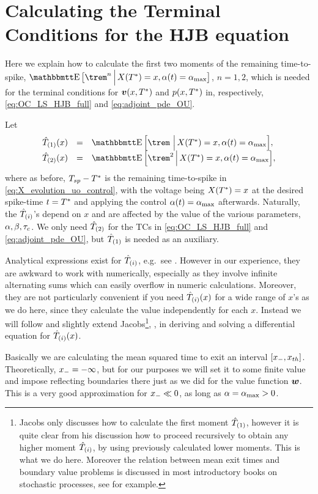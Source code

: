\section{Calculating the Terminal Conditions for the HJB equation}
\label{sec:valuefun_TCs}
Here we explain how to calculate the first two moments of the remaining
time-to-spike, $\Exp \big[\trem^n \,\Big|\, X(\T) = x, \a(t) = \amax
\big]$, $n=1,2$, which is needed for the terminal conditions for ${ \boldsymbol{v} }(x,{ T^* })$
and $p(x,{ T^* })$ in, respectively, \cref{eq:OC_LS_HJB_full} and
\cref{eq:adjoint_pde_OU}.

Let
\begin{equation}
\begin{array}{lcl}
\Tone(x) &=& \Exp \Big[\trem \,\,\Big|\, X(\T) = x, \a(t) = \amax
\Big],
\\
\Ttwo(x) &=&
\Exp \Big[\trem^2 \,\Big|\, X(\T) = x, \a(t) = \amax \Big],
\end{array}
\end{equation}
where as before, $T_{sp}-{ T^* }$ is the remaining time-to-spike in
\cref{eq:X_evolution_uo_control}, with the voltage being $X({ T^* }) = x$ at the desired
spike-time $t={ T^* }$ and applying the control $\alpha(t) = { \alpha_{\textrm{max}} }$ afterwards.
Naturally, the ${ \hat{T}_{(i)} }$'s depend on $x$ and are affected by the value of the
various parameters, $\alpha,\beta,\tau_c$. We only  need ${ \hat{T}_{(2)} }$ for the TCs in
\cref{eq:OC_LS_HJB_full} and \cref{eq:adjoint_pde_OU}, but ${ \hat{T}_{(1)} }$ is needed as
an auxiliary. 
  
Analytical expressions exist for ${ \hat{T}_{(i)} }$, e.g.\ see \cite{Inoue1995}.
However in our experience, they are awkward to work with numerically, especially
as they involve infinite alternating sums which can easily overflow in numeric
calculations. Moreover, they are not particularly convenient if you need ${ \hat{T}_{(i)} }
(x)$ for a wide range of $x$'s as we do here, since they calculate the value
independently for each $x$. Instead we will follow and slightly extend Jacobs\footnote{Jacobs only discusses how to calculate the first moment
${ \hat{T}_{(1)} }$, however it is quite clear from his discussion how to proceed
recursively to obtain any higher moment ${ \hat{T}_{(i)} }$, by using previously calculated
lower moments. This is what we do here. Moreover the relation between mean exit
times and boundary value problems is discussed in most
introductory books on stochastic processes, see \cite{Oksendal2007} for
example.}, \cite{Jacobs}, in deriving and solving a differential equation for
${ \hat{T}_{(i)} }(x)$.

Basically we are calculating the mean squared time to exit an interval $[{ x_{-} },
{ x_{th} }]$. Theoretically, ${ x_{-} } = -\infty$, but for our purposes we will set it to
some finite value and impose reflecting boundaries there just as we did for the
value function ${ \boldsymbol{w} }$. This is a very good approximation for ${ x_{-} } \ll 0$, as
long as $\alpha = { \alpha_{\textrm{max}} } >0$.

